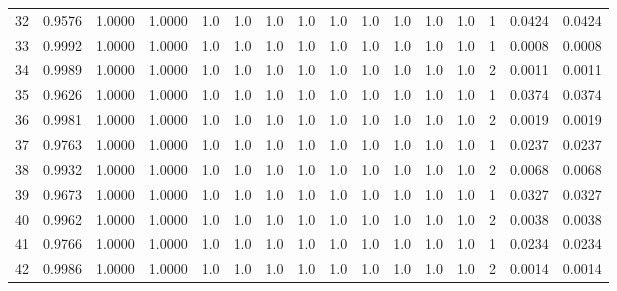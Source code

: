 \begin{tabular}{lrrrrrrrrrrrrrrr}
32  &      0.9576 &  1.0000 &  1.0000 &     1.0 &     1.0 &     1.0 &     1.0 &     1.0 &     1.0 &     1.0 &      1.0 &        1.0 &      1 &                    0.0424 &                     0.0424 \\
33  &      0.9992 &  1.0000 &  1.0000 &     1.0 &     1.0 &     1.0 &     1.0 &     1.0 &     1.0 &     1.0 &      1.0 &        1.0 &      1 &                    0.0008 &                     0.0008 \\
34  &      0.9989 &  1.0000 &  1.0000 &     1.0 &     1.0 &     1.0 &     1.0 &     1.0 &     1.0 &     1.0 &      1.0 &        1.0 &      2 &                    0.0011 &                     0.0011 \\
35  &      0.9626 &  1.0000 &  1.0000 &     1.0 &     1.0 &     1.0 &     1.0 &     1.0 &     1.0 &     1.0 &      1.0 &        1.0 &      1 &                    0.0374 &                     0.0374 \\
36  &      0.9981 &  1.0000 &  1.0000 &     1.0 &     1.0 &     1.0 &     1.0 &     1.0 &     1.0 &     1.0 &      1.0 &        1.0 &      2 &                    0.0019 &                     0.0019 \\
37  &      0.9763 &  1.0000 &  1.0000 &     1.0 &     1.0 &     1.0 &     1.0 &     1.0 &     1.0 &     1.0 &      1.0 &        1.0 &      1 &                    0.0237 &                     0.0237 \\
38  &      0.9932 &  1.0000 &  1.0000 &     1.0 &     1.0 &     1.0 &     1.0 &     1.0 &     1.0 &     1.0 &      1.0 &        1.0 &      2 &                    0.0068 &                     0.0068 \\
39  &      0.9673 &  1.0000 &  1.0000 &     1.0 &     1.0 &     1.0 &     1.0 &     1.0 &     1.0 &     1.0 &      1.0 &        1.0 &      1 &                    0.0327 &                     0.0327 \\
40  &      0.9962 &  1.0000 &  1.0000 &     1.0 &     1.0 &     1.0 &     1.0 &     1.0 &     1.0 &     1.0 &      1.0 &        1.0 &      2 &                    0.0038 &                     0.0038 \\
41  &      0.9766 &  1.0000 &  1.0000 &     1.0 &     1.0 &     1.0 &     1.0 &     1.0 &     1.0 &     1.0 &      1.0 &        1.0 &      1 &                    0.0234 &                     0.0234 \\
42  &      0.9986 &  1.0000 &  1.0000 &     1.0 &     1.0 &     1.0 &     1.0 &     1.0 &     1.0 &     1.0 &      1.0 &        1.0 &      2 &                    0.0014 &                     0.0014 \\

\end{tabular}

